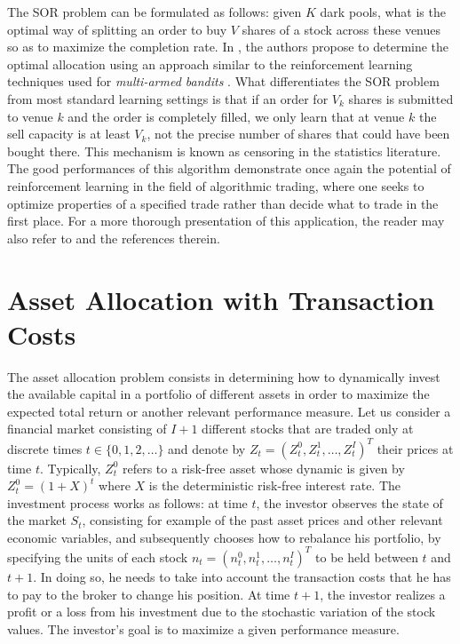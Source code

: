 The SOR problem can be formulated as follows: given $K$ dark pools, what is the optimal way of splitting an order to buy $V$ shares of a stock across these venues so as to maximize the completion rate. In \cite{ganchev2010censored}, the authors propose to determine the optimal allocation using an approach similar to the reinforcement learning techniques used for \emph{multi-armed bandits} \cite{gittins2011multi}. What differentiates the SOR problem from most standard learning settings is that if an order for $V_k$ shares is submitted to venue $k$ and the order is completely filled, we only learn that at venue $k$ the sell capacity is at least $V_k$, not the precise number of shares that could have been bought there. This mechanism is known as censoring in the statistics literature. The good performances of this algorithm demonstrate once again the potential of reinforcement learning in the field of algorithmic trading, where one seeks to optimize properties of a specified trade rather than decide what to trade in the first place. For a more thorough presentation of this application, the reader may also refer to \cite{kearns2013machine} and the references therein.\\

\section{Asset Allocation with Transaction Costs}
\label{sec:asset_allocation_with_transaction_costs}

The asset allocation problem consists in determining how to dynamically invest the available capital in a portfolio of different assets in order to maximize the expected total return or another relevant performance measure. Let us consider a financial market consisting of $I+1$ different stocks that are traded only at discrete times $t \in \{0, 1, 2, \ldots\}$ and denote by ${Z}_t = {(Z_t^0, Z_t^1, \ldots, Z_t^I)}^T$ their prices at time $t$. Typically, $Z_t^0$ refers to a risk-free asset whose dynamic is given by $Z_t^0 = {(1 + X)}^t$ where $X$ is the deterministic risk-free interest rate. The investment process works as follows: at time $t$, the investor observes the state of the market $S_t$, consisting for example of the past asset prices and other relevant economic variables, and subsequently chooses how to rebalance his portfolio, by specifying the units of each stock ${n}_t = {(n_t^0 , n_t^1 , \ldots , n_t^I)}^T$ to be held between $t$ and $t+1$. In doing so, he needs to take into account the transaction costs that he has to pay to the broker to change his position.  At time $t+1$, the investor realizes a profit or a loss from his investment due to the stochastic variation of the stock values. The investor's goal is to maximize a given performance measure.

